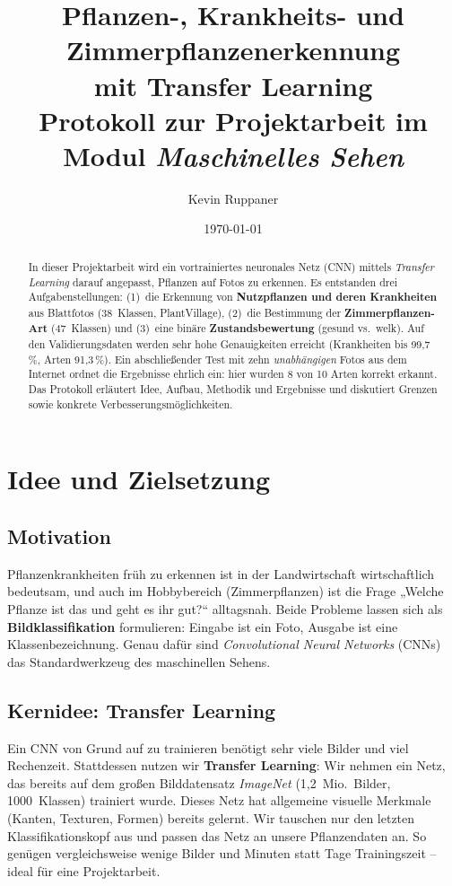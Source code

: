 \documentclass[11pt,a4paper]{article}
\title{\textbf{Pflanzen-, Krankheits- und Zimmerpflanzenerkennung\\mit Transfer Learning}\\[0.4em]
\large Protokoll zur Projektarbeit im Modul \emph{Maschinelles Sehen}}
\author{Kevin Ruppaner}
\date{\today}
\begin{document}
\maketitle

\begin{abstract}
\noindent
In dieser Projektarbeit wird ein vortrainiertes neuronales Netz (CNN) mittels
\emph{Transfer Learning} darauf angepasst, Pflanzen auf Fotos zu erkennen. Es
entstanden drei Aufgabenstellungen: (1)~die Erkennung von \textbf{Nutzpflanzen
und deren Krankheiten} aus Blattfotos (38~Klassen, PlantVillage), (2)~die
Bestimmung der \textbf{Zimmerpflanzen-Art} (47~Klassen) und (3)~eine binäre
\textbf{Zustandsbewertung} (gesund vs.\ welk). Auf den Validierungsdaten werden
sehr hohe Genauigkeiten erreicht (Krankheiten bis 99{,}7\,\%, Arten 91{,}3\,\%).
Ein abschließender Test mit zehn \emph{unabhängigen} Fotos aus dem Internet
ordnet die Ergebnisse ehrlich ein: hier wurden 8 von 10 Arten korrekt erkannt.
Das Protokoll erläutert Idee, Aufbau, Methodik und Ergebnisse und diskutiert
Grenzen sowie konkrete Verbesserungsmöglichkeiten.
\end{abstract}

\tableofcontents
\bigskip

\section{Idee und Zielsetzung}

\subsection{Motivation}
Pflanzenkrankheiten früh zu erkennen ist in der Landwirtschaft wirtschaftlich
bedeutsam, und auch im Hobbybereich (Zimmerpflanzen) ist die Frage „Welche
Pflanze ist das und geht es ihr gut?“ alltagsnah. Beide Probleme lassen sich als
\textbf{Bildklassifikation} formulieren: Eingabe ist ein Foto, Ausgabe ist eine
Klassenbezeichnung. Genau dafür sind \emph{Convolutional Neural Networks} (CNNs)
das Standardwerkzeug des maschinellen Sehens.

\subsection{Kernidee: Transfer Learning}
Ein CNN von Grund auf zu trainieren benötigt sehr viele Bilder und viel
Rechenzeit. Stattdessen nutzen wir \textbf{Transfer Learning}: Wir nehmen ein
Netz, das bereits auf dem großen Bilddatensatz \emph{ImageNet}
(1{,}2~Mio.\ Bilder, 1000~Klassen) trainiert wurde. Dieses Netz hat allgemeine
visuelle Merkmale (Kanten, Texturen, Formen) bereits gelernt. Wir tauschen nur
den letzten Klassifikationskopf aus und passen das Netz an unsere Pflanzendaten
an. So genügen vergleichsweise wenige Bilder und Minuten statt Tage Trainingszeit
-- ideal für eine Projektarbeit.
\end{document}
